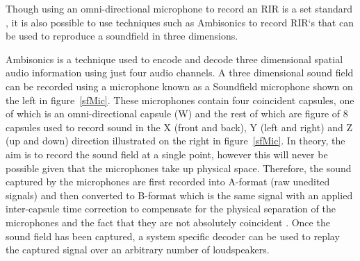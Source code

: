 \documentclass[../../main.tex]{subfiles}
\begin{document}
		Though using an omni-directional microphone to record an \ac{RIR} is a set standard \cite{ISO}, it is also possible to use techniques such as Ambisonics to record \ac{RIR}`s that can be used to reproduce a soundfield in three dimensions.

		Ambisonics is a technique used to encode and decode three dimensional spatial audio information using just four audio channels. A three dimensional sound field can be recorded using a microphone known as a Soundfield microphone shown on the left in figure~\ref{sfMic}. These microphones contain four coincident capsules, one of which is an omni-directional capsule (W) and the rest of which are figure of 8 capsules used to record sound in the X (front and back), Y (left and right) and Z (up and down) direction illustrated on the right in figure~\ref{sfMic}. In theory, the aim is to record the sound field at a single point, however this will never be possible given that the microphones take up physical space. Therefore, the sound captured by the microphones are first recorded into A-format (raw unedited signals) and then converted to B-format which is the same signal with an applied inter-capsule time correction to compensate for the physical separation of the microphones \cite{sosAmbisonics} and the fact that they are not absolutely coincident \cite{Power}. Once the sound field has been captured, a system specific decoder can be used to replay the captured signal over an arbitrary number of loudspeakers.
\end{document}
